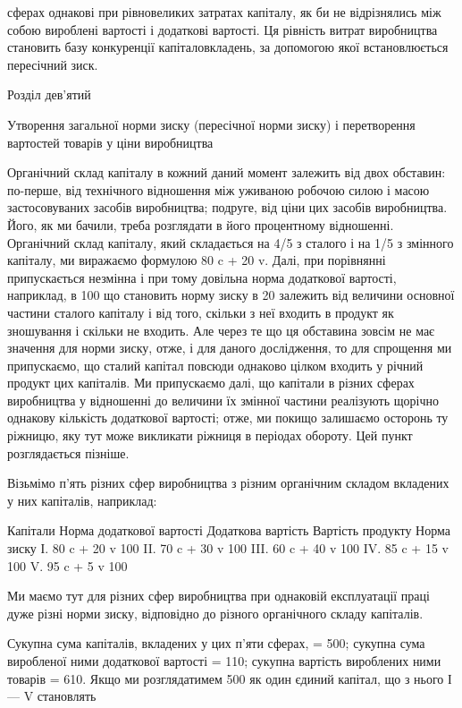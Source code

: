 сферах однакові при рівновеликих затратах капіталу, як би не
відрізнялись між собою вироблені вартості і додаткові вартості.
Ця рівність витрат виробництва становить базу конкуренції капіталовкладень, за допомогою якої
встановлюється пересічний зиск.

Розділ дев’ятий

Утворення загальної норми зиску (пересічної норми зиску) і перетворення вартостей товарів у ціни
виробництва

Органічний склад капіталу в кожний даний момент залежить
від двох обставин: по-перше, від технічного відношення між уживаною робочою силою і масою
застосовуваних засобів виробництва; подруге, від ціни цих засобів виробництва. Його, як ми бачили,
треба розглядати в його процентному відношенні. Органічний склад капіталу, який складається на 4/5 з
сталого і на 1/5 з змінного капіталу, ми виражаємо формулою 80 c + 20 v. Далі, при
порівнянні припускається незмінна і при тому довільна норма
додаткової вартості, наприклад, в 100%
що становить норму зиску
в 20%
залежить від величини основної частини сталого капіталу і від
того, скільки з неї входить в продукт як зношування і скільки
не входить. Але через те що ця обставина зовсім не має значення для норми зиску, отже, і для даного
дослідження, то для
спрощення ми припускаємо, що сталий капітал повсюди однаково цілком входить у річний продукт цих
капіталів. Ми припускаємо далі, що капітали в різних сферах виробництва у
відношенні до величини їх змінної частини реалізують щорічно
однакову кількість додаткової вартості; отже, ми покищо залишаємо осторонь ту ріжницю, яку тут може
викликати ріжниця
в періодах обороту. Цей пункт розглядається пізніше.

Візьмімо п’ять різних сфер виробництва з різним органічним
складом вкладених у них капіталів, наприклад:

Капітали    Норма додаткової вартості    Додаткова  вартість    Вартість продукту   Норма  зиску
І. 80 c + 20 v    100%
II. 70 c + 30 v   100%
III. 60 c + 40 v   100%
IV. 85 c + 15 v   100%
V. 95 c + 5 v     100%

Ми маємо тут для різних сфер виробництва при однаковій
експлуатації праці дуже різні норми зиску, відповідно до різного органічного складу капіталів.

Сукупна сума капіталів, вкладених у цих п’яти сферах, = 500;
сукупна сума виробленої ними додаткової вартості = 110; сукупна вартість вироблених ними товарів =
610. Якщо ми розглядатимем 500 як один єдиний капітал, що з нього І — V становлять
